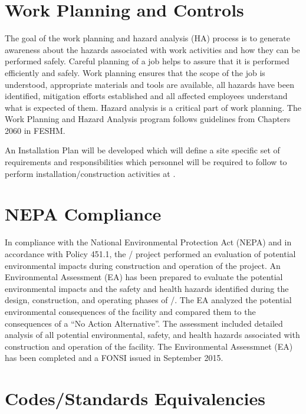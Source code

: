\section{Work Planning and Controls}

The goal of the work planning and hazard analysis (HA) process is to
generate awareness about the hazards associated with work activities
and how they can be performed safely. Careful planning of a job helps
to assure that it is performed efficiently and safely. Work planning
ensures that the scope of the job is understood, appropriate materials
and tools are available, all hazards have been identified, mitigation
efforts established and all affected employees understand what is
expected of them. Hazard analysis is a critical part of work planning.
The Work Planning and Hazard Analysis program follows guidelines from
Chapters 2060 in FESHM.

An Installation  Plan will be developed
which will define a site specific set of  requirements and
responsibilities which personnel will be required to follow to perform
installation/construction activities at \surf.

\section{NEPA Compliance}

In compliance with the National Environmental Protection Act (NEPA)
and in accordance with  Policy 451.1, the
/ project performed an evaluation of potential
environmental impacts during construction and operation of the
project.  An Environmental Assessment (EA) has been prepared to
evaluate the potential environmental impacts and the safety and health
hazards identified during the design, construction, and operating
phases of /.  The EA analyzed the potential
environmental consequences of the facility and compared them to the
consequences of a ``No Action Alternative''. The assessment included
detailed analysis of all potential environmental, safety, and health
hazards associated with construction and operation of the facility.
The Environmental Assessmnet (EA) has been completed and a FONSI
issued in September 2015.

\section{Codes/Standards Equivalencies}
\label{sec:esh_codes}

